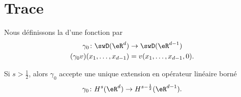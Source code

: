 \section{Trace}

\begin{definition}
    Nous définissons la  d'une fonction par
    \begin{equation}
        \begin{aligned}
            \gamma_0\colon   \swD(\eR^d)  &\to \swD(\eR^{d-1}) \\
            (\gamma_0v)(x_1,\ldots, x_{d-1})&=v(x_1,\ldots, x_{d-1},0).
        \end{aligned}
    \end{equation}
\end{definition}

\begin{theorem}       \label{THOooXEJZooBKtXBW}
    Si \( s>\frac{ 1 }{2}\), alors \( \gamma_0\) accepte une unique extension en opérateur linéaire borné
    \begin{equation}
        \gamma_0\colon H^s(\eR^d)\to H^{s-\frac{ 1 }{2}}(\eR^{d-1}).
    \end{equation}
\end{theorem}

